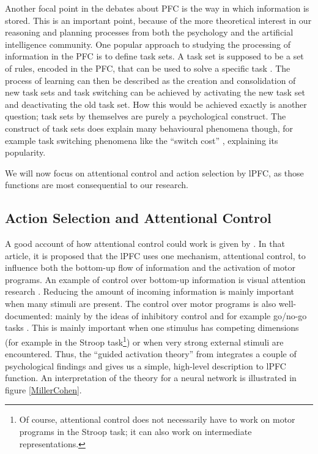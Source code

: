 \documentclass[10pt,a4paper]{report}
\begin{document}
Another focal point in the debates about PFC is the way in which information is stored. This is an important point, because of the more theoretical interest in our reasoning and planning processes from both the psychology and the artificial intelligence community. One popular approach to studying the processing of information in the PFC is to define task sets. A task set is supposed to be a set of rules, encoded in the PFC, that can be used to solve a specific task \citep{Sakai2008}. The process of learning can then be described as the creation and consolidation of new task sets and task switching can be achieved by activating the new task set and deactivating the old task set. How this would be achieved exactly is another question; task sets by themselves are purely a psychological construct. The construct of task sets does explain many behavioural phenomena though, for example task switching phenomena like the ``switch cost'' \citep{Monsell2003}, explaining its popularity.

We will now focus on attentional control and action selection by lPFC, as those functions are most consequential to our research.

\subsection*{Action Selection and Attentional Control}

A good account of how attentional control could work is given by \citet{Miller2001}. In that article, it is proposed that the lPFC uses one mechanism, attentional control, to influence both the bottom-up flow of information and the activation of motor programs. An example of control over bottom-up information is visual attention research \citep{Rossi2009, Passingham2002, Morse2009}. Reducing the amount of incoming information is mainly important when many stimuli are present. The control over motor programs is also well-documented: mainly by the ideas of inhibitory control and for example go/no-go tasks \citep{Garavan1999, Mink1996}. This is mainly important when one stimulus has competing dimensions (for example in the Stroop task\footnote{Of course, attentional control does not necessarily have to work on motor programs in the Stroop task; it can also work on intermediate representations.}) or when very strong external stimuli are encountered. Thus, the ``guided activation theory'' from \citet{Miller2001} integrates a couple of psychological findings and gives us a simple, high-level description to lPFC function. An interpretation of the theory for a neural network is illustrated in figure \ref{MillerCohen}.
\end{document}

